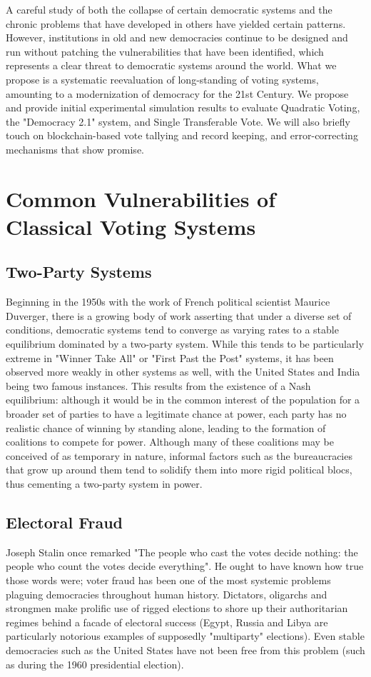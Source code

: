 \documentclass[a4paper]{article}
\begin{document}
A careful study of both the collapse of certain democratic systems and the chronic problems that have developed in others have yielded certain patterns. However, institutions in old and new democracies continue to be designed and run without patching the vulnerabilities that have been identified, which represents a clear threat to democratic systems around the world. What we propose is a systematic reevaluation of long-standing of voting systems, amounting to a modernization of democracy for the 21st Century. We propose and provide initial experimental simulation results to evaluate Quadratic Voting, the "Democracy 2.1" system, and Single Transferable Vote. We will also briefly touch on blockchain-based vote tallying and record keeping, and error-correcting mechanisms that show promise. 

\section{Common Vulnerabilities of Classical Voting Systems}

\subsection{Two-Party Systems}
Beginning in the 1950s with the work of French political scientist Maurice Duverger, there is a growing body of work asserting that under a diverse set of conditions, democratic systems tend to converge as varying rates to a stable equilibrium dominated by a two-party system. While this tends to be particularly extreme in "Winner Take All" or "First Past the Post" systems, it has been observed more weakly in other systems as well, with the United States and India being two famous instances. This results from the existence of a Nash equilibrium: although it would be in the common interest of the population for a broader set of parties to have a legitimate chance at power, each party has no realistic chance of winning by standing alone, leading to the formation of coalitions to compete for power. Although many of these coalitions may be conceived of as temporary in nature, informal factors such as the bureaucracies that grow up around them tend to solidify them into more rigid political blocs, thus cementing a two-party system in power.

\subsection{Electoral Fraud}
Joseph Stalin once remarked "The people who cast the votes decide nothing: the people who count the votes decide everything". He ought to have known how true those words were; voter fraud has been one of the most systemic problems plaguing democracies throughout human history. Dictators, oligarchs and strongmen make prolific use of rigged elections to shore up their authoritarian regimes behind a facade of electoral success (Egypt, Russia and Libya are particularly notorious examples of supposedly "multiparty" elections). Even stable democracies such as the United States have not been free from this problem (such as during the 1960 presidential election).
\end{document}
